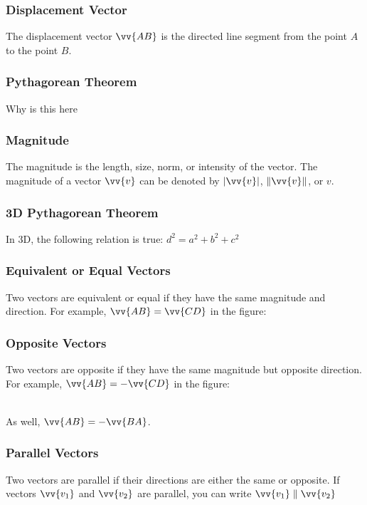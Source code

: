 \documentclass{article}
\begin{document}
	\subsubsection{Displacement Vector}
	The displacement vector $\vv{AB}$ is the directed line segment from the point $A$ to the point $B$.
	\subsubsection{Pythagorean Theorem}
	Why is this here
	\subsubsection{Magnitude}
	The magnitude is the length, size, norm, or intensity of the vector. The magnitude of a vector $\vv{v}$ can be denoted by $|\vv{v}|$, $\lVert\vv{v}\rVert$, or $v$.
	\subsubsection{3D Pythagorean Theorem}
	In 3D, the following relation is true: $d^2=a^2+b^2+c^2$
	\subsubsection{Equivalent or Equal Vectors}
	Two vectors are equivalent or equal if they have the same magnitude and direction. For example, $\vv{AB}=\vv{CD}$ in the figure:\\
	\subsubsection{Opposite Vectors}
	Two vectors are opposite if they have the same magnitude but opposite direction. For example, $\vv{AB}=-\vv{CD}$ in the figure:\\
	\\
	As well, $\vv{AB}=-\vv{BA}$.
	\subsubsection{Parallel Vectors}
	Two vectors are parallel if their directions are either the same or opposite. If vectors $\vv{v_1}$ and $\vv{v_2}$ are parallel, you can write $\vv{v_1}\parallel\vv{v_2}$\\
\end{document}

